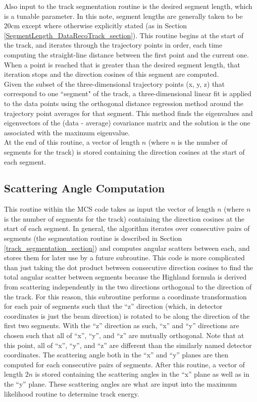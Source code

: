 Also input to the track segmentation routine is the desired segment length, which is a tunable parameter. In this note, segment lengths are generally taken to be 20cm except where otherwise explicitly stated (as in Section \ref{SegmentLength_DataRecoTrack_section}). This routine begins at the start of the track, and iterates through the trajectory points in order, each time computing the straight-line distance between the first point and the current one. When a point is reached that is greater than the desired segment length, that iteration stops and the direction cosines of this segment are computed.\\

Given the subset of the three-dimensional trajectory points (x, y, z) that correspond to one ``segment" of the track, a three-dimensional linear fit is applied to the data points using the orthogonal distance regression method around the trajectory point averages for that segment. This method finds the eigenvalues and eigenvectors of the (data - average) covariance matrix and the solution is the one associated with the maximum eigenvalue.\\

At the end of this routine, a vector of length $n$ (where $n$ is the number of segments for the track) is stored containing the direction cosines at the start of each segment.


\subsection{Scattering Angle Computation}\label{scattering_angle_computation_section}
This routine within the MCS code takes as input the vector of length $n$ (where $n$ is the number of segments for the track) containing the direction cosines at the start of each segment. In general, the algorithm iterates over consecutive pairs of segments (the segmentation routine is described in Section \ref{track_segmentation_section}) and computes angular scatters between each, and stores them for later use by a future subroutine. This code is more complicated than just taking the dot product between consecutive direction cosines to find the total angular scatter between segments because the Highland formula is derived from scattering independently in the two directions orthogonal to the direction of the track. For this reason, this subroutine performs a coordinate transformation for each pair of segments such that the ``z'' direction (which, in detector coordinates is just the beam direction) is rotated to be along the direction of the first two segments. With the ``z'' direction as such, ``x'' and ``y'' directions are chosen such that all of ``x'', ``y'', and ``z'' are mutually orthogonal. Note that at this point, all of ``x'', ``y'', and ``z'' are different than the similarly named detector coordinates. The scattering angle both in the ``x'' and ``y'' planes are then computed for each consecutive pairs of segments. After this routine, a vector of length $2n$ is stored containing the scattering angles in the ``x'' plane as well as in the ``y'' plane. These scattering angles are what are input into the maximum likelihood routine to determine track energy.


